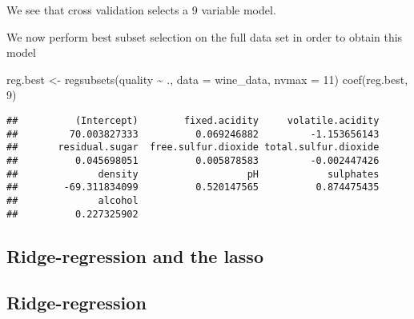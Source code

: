 \documentclass[
]{article}
\newenvironment{Shaded}{\begin{snugshade}}{\end{snugshade}}
\newcommand{\AttributeTok}[1]{\textcolor[rgb]{0.77,0.63,0.00}{#1}}
\newcommand{\DecValTok}[1]{\textcolor[rgb]{0.00,0.00,0.81}{#1}}
\newcommand{\FunctionTok}[1]{\textcolor[rgb]{0.00,0.00,0.00}{#1}}
\newcommand{\NormalTok}[1]{#1}
\newcommand{\OtherTok}[1]{\textcolor[rgb]{0.56,0.35,0.01}{#1}}
\newcommand{\SpecialCharTok}[1]{\textcolor[rgb]{0.00,0.00,0.00}{#1}}
\begin{document}
We see that cross validation selects a 9 variable model.

We now perform best subset selection on the full data set in order to
obtain this model

\begin{Shaded}
\begin{Highlighting}[]
\NormalTok{reg.best }\OtherTok{\textless{}{-}} \FunctionTok{regsubsets}\NormalTok{(quality }\SpecialCharTok{\textasciitilde{}}\NormalTok{ ., }\AttributeTok{data =}\NormalTok{ wine\_data, }\AttributeTok{nvmax =} \DecValTok{11}\NormalTok{)}
\FunctionTok{coef}\NormalTok{(reg.best, }\DecValTok{9}\NormalTok{)}
\end{Highlighting}
\end{Shaded}

\begin{verbatim}
##          (Intercept)        fixed.acidity     volatile.acidity 
##         70.003827333          0.069246882         -1.153656143 
##       residual.sugar  free.sulfur.dioxide total.sulfur.dioxide 
##          0.045698051          0.005878583         -0.002447426 
##              density                   pH            sulphates 
##        -69.311834099          0.520147565          0.874475435 
##              alcohol 
##          0.227325902
\end{verbatim}

\hypertarget{ridge-regression-and-the-lasso}{%
\subsection{Ridge-regression and the
lasso}\label{ridge-regression-and-the-lasso}}

\hypertarget{ridge-regression}{%
\subsection{Ridge-regression}\label{ridge-regression}}

\begin{Shaded}
\end{Shaded}
\end{document}
